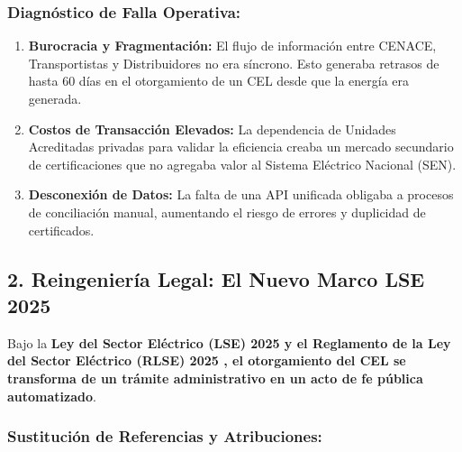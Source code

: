 \documentclass{cel}
\begin{document}
\subsubsection{Diagnóstico de Falla Operativa:}
\nopagebreak

\begin{enumerate}
\item \textbf{Burocracia y Fragmentación:} El flujo de información entre CENACE, Transportistas y Distribuidores no era síncrono. Esto generaba retrasos de hasta 60 días en el otorgamiento de un CEL desde que la energía era generada.
\item \textbf{Costos de Transacción Elevados:} La dependencia de \textquotedbl{}Unidades Acreditadas\textquotedbl{} privadas para validar la eficiencia creaba un mercado secundario de certificaciones que no agregaba valor al Sistema Eléctrico Nacional (SEN).
\item \textbf{Desconexión de Datos:} La falta de una API unificada obligaba a procesos de conciliación manual, aumentando el riesgo de errores y duplicidad de certificados.


\end{enumerate}
\subsection{2. Reingeniería Legal: El Nuevo Marco LSE 2025}
\nopagebreak

Bajo la \textbf{Ley del Sector Eléctrico (LSE) 2025 \textbf{ y el }Reglamento de la Ley del Sector Eléctrico (RLSE) 2025 \textbf{, el otorgamiento del CEL se transforma de un trámite administrativo en un }acto de fe pública automatizado}.


\subsubsection{Sustitución de Referencias y Atribuciones:}
\nopagebreak
\end{document}
